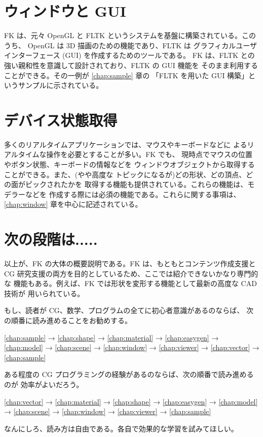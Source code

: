 \section{ウィンドウと GUI}
FK は、元々 OpenGL と FLTK というシステムを基盤に構築されている。このうち、
OpenGL は 3D 描画のための機能であり、FLTK は
グラフィカルユーザインターフェース (GUI) を作成するためのツールである。
FK は、FLTK との強い親和性を意識して設計されており、FLTK の GUI 機能を
そのまま利用することができる。その一例が \ref{chap:sample} 章の
「FLTK を用いた GUI 構築」というサンプルに示されている。

\section{デバイス状態取得}
多くのリアルタイムアプリケーションでは、マウスやキーボードなどに
よるリアルタイムな操作を必要とすることが多い。FK でも、
現時点でマウスの位置やボタン状態、キーボードの情報などを
ウィンドウオブジェクトから取得することができる。また、(やや高度な
トピックになるが)どの形状、どの頂点、どの面がピックされたかを
取得する機能も提供されている。これらの機能は、モデラーなどを
作成する際には必須の機能である。これらに関する事項は、
\ref{chap:window} 章を中心に記述されている。

\section{次の段階は.....}
以上が、FK の大体の概要説明である。FK は、もともとコンテンツ作成支援と
CG 研究支援の両方を目的としているため、ここでは紹介できないかなり専門的な
機能もある。例えば、FK では形状を変形する機能として最新の高度な CAD 技術が
用いられている。

もし、読者が CG、数学、プログラムの全てに初心者意識があるのならば、
次の順番に読み進めることをお勧めする。
\begin{center}
\ref{chap:sample} → \ref{chap:shape} → \ref{chap:material} →
\ref{chap:easygen} →
\ref{chap:model} → \ref{chap:scene} → \ref{chap:window} →
\ref{chap:viewer} → \ref{chap:vector} → \ref{chap:sample} 
\end{center}
ある程度の CG プログラミングの経験があるのならば、次の順番で読み進めるのが
効率がよいだろう。
\begin{center}
\ref{chap:vector} → \ref{chap:material} → \ref{chap:shape} →
\ref{chap:easygen} →
\ref{chap:model} → \ref{chap:scene} → \ref{chap:window} →
\ref{chap:viewer} → \ref{chap:sample}
\end{center}

なんにしろ、読み方は自由である。各自で効果的な学習を試みてほしい。
